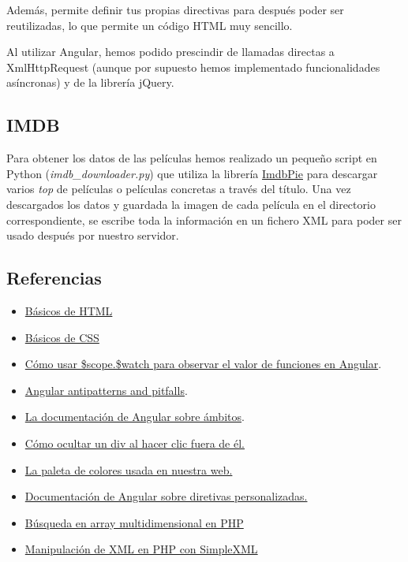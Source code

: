 \documentclass{apuntes}
\begin{document}
Además, permite definir tus propias directivas para después poder ser reutilizadas, lo que permite un código HTML muy sencillo.


Al utilizar Angular, hemos podido prescindir de llamadas directas a XmlHttpRequest (aunque por supuesto hemos implementado funcionalidades asíncronas) y de la librería jQuery.

\subsection{IMDB}

Para obtener los datos de las películas hemos realizado un pequeño script en Python (\textit{imdb\_downloader.py}) que utiliza la librería \href{https://github.com/richardasaurus/imdb-pie}{ImdbPie} para descargar varios \textit{top} de películas o películas concretas a través del título. Una vez descargados los datos y guardada la imagen de cada película en el directorio correspondiente, se escribe toda la información en un fichero XML para poder ser usado después por nuestro servidor.

\subsection{Referencias}

\begin{itemize}
	\item \href{http://www.w3schools.com/html/default.asp}{Básicos de HTML}
	\item \href{http://www.w3schools.com/css/default.asp}{Básicos de CSS}
	\item \href{http://www.bennadel.com/blog/2658-using-scope-watch-to-watch-functions-in-angularjs.htm}{Cómo usar \$scope.\$watch para observar el valor de funciones en Angular}.
	\item \href{http://nathanleclaire.com/blog/2014/04/19/5-angularjs-antipatterns-and-pitfalls/}{Angular antipatterns and pitfalls}.
	\item \href{https://github.com/angular/angular.js/wiki/Understanding-Scopes}{La documentación de Angular sobre ámbitos}.
	\item \href{http://stackoverflow.com/questions/17706847/not-sure-how-to-hide-a-div-when-clicking-outside-of-the-div}{Cómo ocultar un div al hacer clic fuera de él.}
	\item \href{http://www.colorcombos.com/color-schemes/22/ColorCombo22.html}{La paleta de colores usada en nuestra web.}
	\item \href{https://docs.angularjs.org/guide/directive}{Documentación de Angular sobre diretivas personalizadas.}
	\item \href{http://stackoverflow.com/questions/6661530/php-multi-dimensional-array-search}{Búsqueda en array multidimensional en PHP}
	\item \href{http://php.net/manual/es/book.simplexml.php}{Manipulación de XML en PHP con SimpleXML}
\end{itemize}
\end{document}
